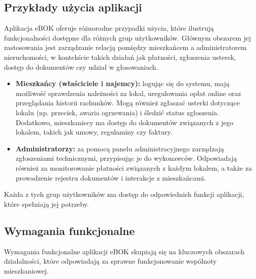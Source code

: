 \subsection{Przykłady użycia aplikacji}

Aplikacja eBOK oferuje różnorodne przypadki użycia, które ilustrują funkcjonalności dostępne dla różnych grup użytkowników. Głównym obszarem jej zastosowania jest zarządzanie relacją pomiędzy mieszkańcem a administratorem nieruchomości, w kontekście takich działań jak płatności, zgłoszenia usterek, dostęp do dokumentów czy udział w głosowaniach.

\begin{itemize} 

	\item \textbf{Mieszkańcy (właściciele i najemcy):} logując się do systemu, mają możliwość sprawdzenia należności za lokal, uregulowania opłat online oraz przeglądania historii rachunków. Mogą również zgłaszać usterki dotyczące lokalu (np. przeciek, awaria ogrzewania) i śledzić status zgłoszenia. Dodatkowo, mieszkaniecy ma dostęp do dokumentów związanych z jego lokalem, takich jak umowy, regulaminy czy faktury.
	
	\item \textbf{Administratorzy:} za pomocą panelu administracyjnego zarządzają zgłoszeniami technicznymi, przypisując je do wykonawców. Odpowiadają również za monitorowanie płatności związanych z każdym lokalem, a także za prowadzenie rejestru dokumentów i interakcje z mieszkańcami.
	
\end{itemize}

Każda z tych grup użytkowników ma dostęp do odpowiednich funkcji aplikacji, które spełniają jej potrzeby.

\subsection{Wymagania funkcjonalne}

Wymagania funkcjonalne aplikacji eBOK skupiają się na kluczowych obszarach działalności, które odpowiadają za sprawne funkcjonowanie wspólnoty mieszkaniowej.

